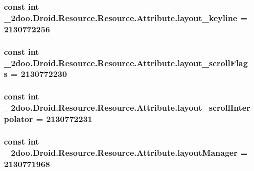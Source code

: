 \hypertarget{class__2doo_1_1_droid_1_1_resource_1_1_attribute_a64cc886f959a6e4f9575d3a823e309c}{
\subsubsection[{layout\_\-keyline}]{\setlength{\rightskip}{0pt plus 5cm}const int \_\-2doo.Droid.Resource.Resource.Attribute.layout\_\-keyline = 2130772256}}
\label{class__2doo_1_1_droid_1_1_resource_1_1_attribute_a64cc886f959a6e4f9575d3a823e309c}


\hypertarget{class__2doo_1_1_droid_1_1_resource_1_1_attribute_4f14be97ffc914996bb316ada642ad28}{
\subsubsection[{layout\_\-scrollFlags}]{\setlength{\rightskip}{0pt plus 5cm}const int \_\-2doo.Droid.Resource.Resource.Attribute.layout\_\-scrollFlags = 2130772230}}
\label{class__2doo_1_1_droid_1_1_resource_1_1_attribute_4f14be97ffc914996bb316ada642ad28}


\hypertarget{class__2doo_1_1_droid_1_1_resource_1_1_attribute_da26e7353a16ebdb0b2765c8e315b31c}{
\subsubsection[{layout\_\-scrollInterpolator}]{\setlength{\rightskip}{0pt plus 5cm}const int \_\-2doo.Droid.Resource.Resource.Attribute.layout\_\-scrollInterpolator = 2130772231}}
\label{class__2doo_1_1_droid_1_1_resource_1_1_attribute_da26e7353a16ebdb0b2765c8e315b31c}


\hypertarget{class__2doo_1_1_droid_1_1_resource_1_1_attribute_624937b76fa47d73df2cefc4450630f3}{
\subsubsection[{layoutManager}]{\setlength{\rightskip}{0pt plus 5cm}const int \_\-2doo.Droid.Resource.Resource.Attribute.layoutManager = 2130771968}}
\label{class__2doo_1_1_droid_1_1_resource_1_1_attribute_624937b76fa47d73df2cefc4450630f3}


